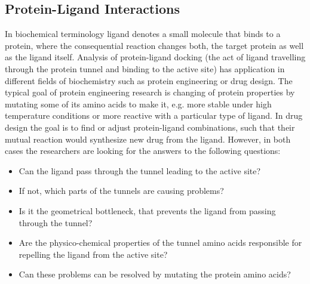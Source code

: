 \subsection{Protein-Ligand Interactions} 
In biochemical terminology ligand denotes a small molecule that binds to a protein, where the consequential reaction changes both, the target protein as well as the ligand itself. Analysis of protein-ligand docking (the act of ligand travelling through the protein tunnel and binding to the active site) has application in different fields of biochemistry such as protein engineering or drug design. The typical goal of protein engineering research is changing of protein properties by mutating some of its amino acids to make it, e.g. more stable under high temperature conditions or more reactive with a particular type of ligand. In drug design the goal is to find or adjust protein-ligand combinations, such that their mutual reaction would synthesize new drug from the ligand.
However, in both cases the researchers are looking for the answers to the following questions:
\begin{itemize}
\setlength\itemsep{0.5pt}
\item{Can the ligand pass through the tunnel leading to the active site?}
\item{If not, which parts of the tunnels are causing problems?}
\item{Is it the geometrical bottleneck, that prevents the ligand from passing through the tunnel?}
\item{Are the physico-chemical properties of the tunnel amino acids responsible for repelling the ligand from the active site?}
\item{Can these problems can be resolved by mutating the protein amino acids?}
\end{itemize}

